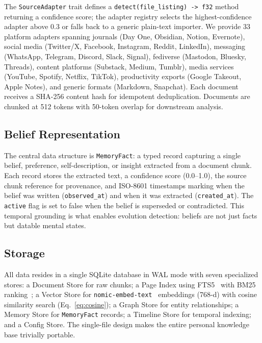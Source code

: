 \documentclass[conference]{IEEEtran}
\begin{document}
The \texttt{SourceAdapter} trait defines a \texttt{detect(file\_listing) -> f32} method returning a confidence score; the adapter registry selects the highest-confidence adapter above 0.3 or falls back to a generic plain-text importer. We provide 33 platform adapters spanning journals (Day One, Obsidian, Notion, Evernote), social media (Twitter/X, Facebook, Instagram, Reddit, LinkedIn), messaging (WhatsApp, Telegram, Discord, Slack, Signal), fediverse (Mastodon, Bluesky, Threads), content platforms (Substack, Medium, Tumblr), media services (YouTube, Spotify, Netflix, TikTok), productivity exports (Google Takeout, Apple Notes), and generic formats (Markdown, Snapchat). Each document receives a SHA-256 content hash for idempotent deduplication. Documents are chunked at 512 tokens with 50-token overlap for downstream analysis.

\subsection{Belief Representation}

The central data structure is \texttt{MemoryFact}: a typed record capturing a single belief, preference, self-description, or insight extracted from a document chunk. Each record stores the extracted text, a confidence score (0.0--1.0), the source chunk reference for provenance, and ISO-8601 timestamps marking when the belief was written (\texttt{observed\_at}) and when it was extracted (\texttt{created\_at}). The \texttt{active} flag is set to false when the belief is superseded or contradicted. This temporal grounding is what enables evolution detection: beliefs are not just facts but datable mental states.

\subsection{Storage}

All data resides in a single SQLite database in WAL mode with seven specialized stores: a Document Store for raw chunks; a Page Index using FTS5~\cite{sqlite2023fts5} with BM25 ranking~\cite{robertson2009bm25}; a Vector Store for \texttt{nomic-embed-text}~\cite{nussbaum2024nomic} embeddings (768-d) with cosine similarity search (Eq.~\ref{eq:cosine}); a Graph Store for entity relationships; a Memory Store for \texttt{MemoryFact} records; a Timeline Store for temporal indexing; and a Config Store. The single-file design makes the entire personal knowledge base trivially portable.
\end{document}
